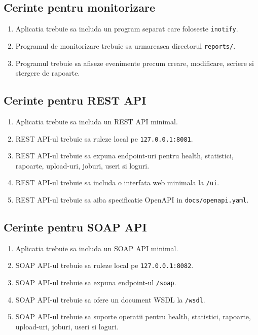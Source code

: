 \documentclass[12pt,a4paper]{article}
\begin{document}
\subsection{Cerinte pentru monitorizare}

\begin{enumerate}[label=CF\arabic*., resume]
    \item Aplicatia trebuie sa includa un program separat care foloseste \texttt{inotify}.
    \item Programul de monitorizare trebuie sa urmareasca directorul \texttt{reports/}.
    \item Programul trebuie sa afiseze evenimente precum creare, modificare, scriere si stergere de rapoarte.
\end{enumerate}

\subsection{Cerinte pentru REST API}

\begin{enumerate}[label=CF\arabic*., resume]
    \item Aplicatia trebuie sa includa un REST API minimal.
    \item REST API-ul trebuie sa ruleze local pe \texttt{127.0.0.1:8081}.
    \item REST API-ul trebuie sa expuna endpoint-uri pentru health, statistici, rapoarte, upload-uri, joburi, useri si loguri.
    \item REST API-ul trebuie sa includa o interfata web minimala la \texttt{/ui}.
    \item REST API-ul trebuie sa aiba specificatie OpenAPI in \texttt{docs/openapi.yaml}.
\end{enumerate}

\subsection{Cerinte pentru SOAP API}

\begin{enumerate}[label=CF\arabic*., resume]
    \item Aplicatia trebuie sa includa un SOAP API minimal.
    \item SOAP API-ul trebuie sa ruleze local pe \texttt{127.0.0.1:8082}.
    \item SOAP API-ul trebuie sa expuna endpoint-ul \texttt{/soap}.
    \item SOAP API-ul trebuie sa ofere un document WSDL la \texttt{/wsdl}.
    \item SOAP API-ul trebuie sa suporte operatii pentru health, statistici, rapoarte, upload-uri, joburi, useri si loguri.
\end{enumerate}
\end{document}
